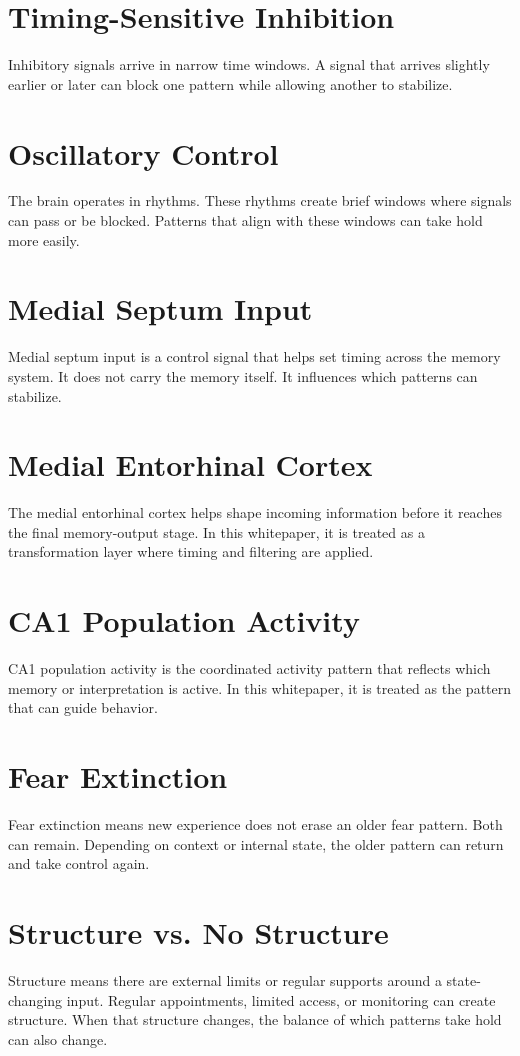 \documentclass[10pt,twocolumn]{article}
\begin{document}
\section{Timing-Sensitive Inhibition}
Inhibitory signals arrive in narrow time windows. A signal that arrives slightly earlier or later can block one pattern while allowing another to stabilize.

\section{Oscillatory Control}
The brain operates in rhythms. These rhythms create brief windows where signals can pass or be blocked. Patterns that align with these windows can take hold more easily.

\section{Medial Septum Input}
Medial septum input is a control signal that helps set timing across the memory system. It does not carry the memory itself. It influences which patterns can stabilize.

\section{Medial Entorhinal Cortex}
The medial entorhinal cortex helps shape incoming information before it reaches the final memory-output stage. In this whitepaper, it is treated as a transformation layer where timing and filtering are applied.

\section{CA1 Population Activity}
CA1 population activity is the coordinated activity pattern that reflects which memory or interpretation is active. In this whitepaper, it is treated as the pattern that can guide behavior.

\section{Fear Extinction}
Fear extinction means new experience does not erase an older fear pattern. Both can remain. Depending on context or internal state, the older pattern can return and take control again.

\section{Structure vs. No Structure}
Structure means there are external limits or regular supports around a state-changing input. Regular appointments, limited access, or monitoring can create structure. When that structure changes, the balance of which patterns take hold can also change.
\end{document}
